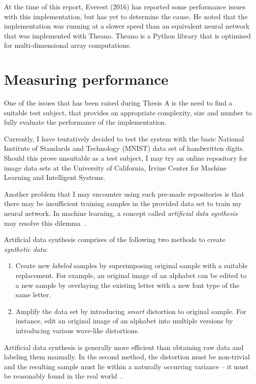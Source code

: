 At the time of this report, Everest (2016) has reported some performance issues with this implementation, but has yet to determine the cause. He noted that the implementation was running at a slower speed than an equivalent neural network that was implemented with Theano. Theano is a Python library that is optimised for multi-dimensional array computations.


\section{Measuring performance} \label{se:measuringperf}

One of the issues that has been raised during Thesis A is the need to find a suitable test subject, that provides an appropriate complexity, size and number to fully evaluate the performance of the implementation. 

Currently, I have tentatively decided to test the system with the basic National Institute of Standards and Technology (MNIST) data set of handwritten digits. Should this prove unsuitable as a test subject, I may try an online repository for image data sets at the University of California, Irvine Center for Machine Learning and Intelligent Systems.

Another problem that I may encounter using such pre-made repositories is that there may be insufficient training samples in the provided data set to train my neural network. In machine learning, a concept called \textit{artificial data synthesis} may resolve this dilemma~\cite{Ng12}. 

Artificial data synthesis comprises of the following two methods to create \textit{synthetic data}: 
\begin{enumerate}
\item Create new \textit{labeled} samples by superimposing original sample with a suitable replacement. For example, an original image of an alphabet can be edited to a new sample by overlaying the existing letter with a new font type of the same letter.
\item Amplify the data set by introducing \textit{smart} distortion to original sample. For instance, edit an original image of an alphabet into multiple versions by introducing various wave-like distortions.
\end{enumerate}

Artificial data synthesis is generally more efficient than obtaining raw data and labeling them manually. In the second method, the distortion must be non-trivial and the resulting sample must lie within a naturally occurring variance -- it must be reasonably found in the real world~\cite{Ng12}.

